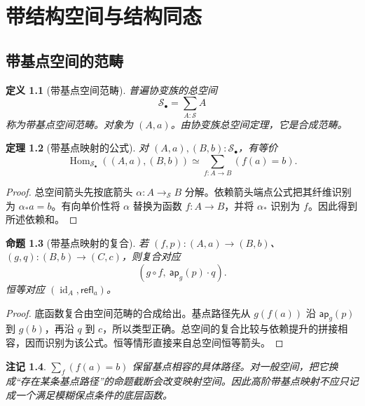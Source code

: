 \documentclass[12pt,oneside,openany,fontset=none]{ctexbook}
\theoremstyle{cn}
\newtheorem{definition}{定义}[chapter]
\newtheorem{proposition}[definition]{命题}
\newtheorem{theorem}[definition]{定理}
\newtheorem{remark}[definition]{注记}
\numberwithin{equation}{chapter}
\newcommand{\Sp}{\mathcal S}
\newcommand{\id}{\operatorname{id}}
\newcommand{\Hom}{\operatorname{Hom}}
\newcommand{\refl}{\mathsf{refl}}
\newcommand{\ap}{\mathsf{ap}}
\begin{document}
\chapter{带结构空间与结构同态}
\section{带基点空间的范畴}
\begin{definition}[带基点空间范畴]
普遍协变族的总空间
\[
\Sp_\bullet=\sum_{A:\Sp}A
\]
称为带基点空间范畴。对象为 $(A,a)$。由协变族总空间定理，它是合成范畴。
\end{definition}
\begin{theorem}[带基点映射的公式]\label{thm:pointed-maps}
对 $(A,a),(B,b):\Sp_\bullet$，有等价
\[
\Hom_{\Sp_\bullet}((A,a),(B,b))
\simeq\sum_{f:A\to B}(f(a)=b).
\]
\end{theorem}
\begin{proof}
总空间箭头先按底箭头 $\alpha:A\to_\Sp B$ 分解。依赖箭头端点公式把其纤维识别为 $\alpha_*a=b$。有向单价性将 $\alpha$ 替换为函数 $f:A\to B$，并将 $\alpha_*$ 识别为 $f$。因此得到所述依赖和。
\end{proof}
\begin{proposition}[带基点映射的复合]
若 $(f,p):(A,a)\to(B,b)$、$(g,q):(B,b)\to(C,c)$，则复合对应
\[
(g\circ f,\ \ap_g(p)\cdot q).
\]
恒等对应 $(\id_A,\refl_a)$。
\end{proposition}
\begin{proof}
底函数复合由空间范畴的合成给出。基点路径先从 $g(f(a))$ 沿 $\ap_g(p)$ 到 $g(b)$，再沿 $q$ 到 $c$，所以类型正确。总空间的复合比较与依赖提升的拼接相容，因而识别为该公式。恒等情形直接来自总空间恒等箭头。
\end{proof}
\begin{remark}
$\sum_f(f(a)=b)$ 保留基点相容的具体路径。对一般空间，把它换成“存在某条基点路径”的命题截断会改变映射空间。因此高阶带基点映射不应只记成一个满足模糊保点条件的底层函数。
\end{remark}
\end{document}
